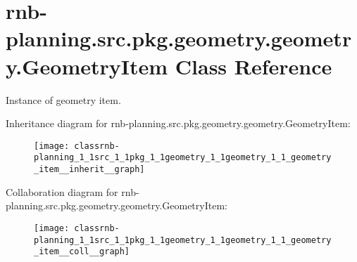 \hypertarget{classrnb-planning_1_1src_1_1pkg_1_1geometry_1_1geometry_1_1_geometry_item}{}\section{rnb-\/planning.src.\+pkg.\+geometry.\+geometry.\+Geometry\+Item Class Reference}
\label{classrnb-planning_1_1src_1_1pkg_1_1geometry_1_1geometry_1_1_geometry_item}


Instance of geometry item.  




Inheritance diagram for rnb-\/planning.src.\+pkg.\+geometry.\+geometry.\+Geometry\+Item\+:\nopagebreak
\begin{figure}[H]
\begin{center}
\leavevmode
\texttt{[image: classrnb-planning\_1\_1src\_1\_1pkg\_1\_1geometry\_1\_1geometry\_1\_1\_geometry\_item\_\_inherit\_\_graph]}
\end{center}
\end{figure}


Collaboration diagram for rnb-\/planning.src.\+pkg.\+geometry.\+geometry.\+Geometry\+Item\+:\nopagebreak
\begin{figure}[H]
\begin{center}
\leavevmode
\texttt{[image: classrnb-planning\_1\_1src\_1\_1pkg\_1\_1geometry\_1\_1geometry\_1\_1\_geometry\_item\_\_coll\_\_graph]}
\end{center}
\end{figure}

